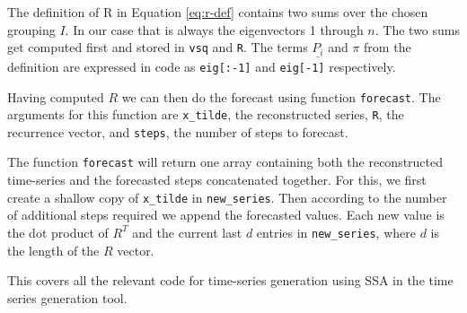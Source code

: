 The definition of R in Equation \eqref{eq:r-def} contains two sums over the chosen grouping $I$. In our case that is always the eigenvectors 1 through $n$. The two sums get computed first and stored in \texttt{vsq} and \texttt{R}. The terms $\underline{P_i}$ and $\pi$ from the definition are expressed in code as \texttt{eig[:-1]} and \texttt{eig[-1]} respectively. 

Having computed $R$ we can then do the forecast using function \texttt{forecast}. The arguments for this function are \texttt{x\_tilde}, the reconstructed series, \texttt{R}, the recurrence vector, and \texttt{steps}, the number of steps to forecast. 


The function \texttt{forecast} will return one array containing both the reconstructed time-series and the forecasted steps concatenated together. For this, we first create a shallow copy of \texttt{x\_tilde} in \texttt{new\_series}. Then according to the number of additional steps required we append the forecasted values. Each new value is the dot product of $R^T$ and the current last $d$ entries in \texttt{new\_series}, where $d$ is the length of the $R$ vector. 

This covers all the relevant code for time-series generation using SSA in the time series generation tool. 